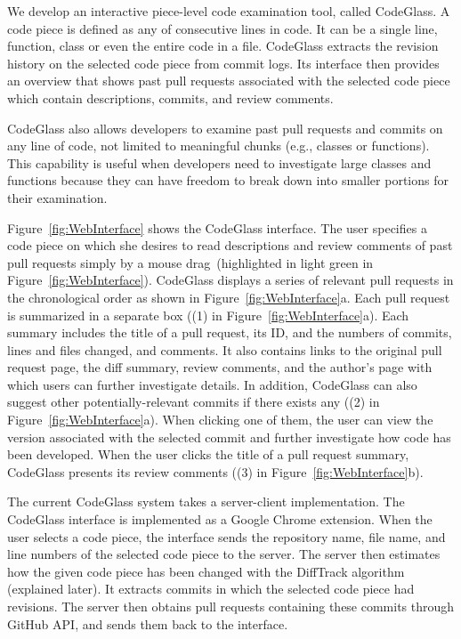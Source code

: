 We develop an interactive piece-level code examination tool, called CodeGlass.
A code piece is defined as any of consecutive lines in code.
It can be a single line, function, class or even the entire code in a file.
CodeGlass extracts the revision history on the selected code piece from commit logs.
Its interface then provides an overview that shows past pull requests associated with the selected code piece which contain descriptions, commits, and review comments.


CodeGlass also allows developers to examine past pull requests and commits on any line of code, not limited to meaningful chunks (e.g., classes or functions).
This capability is useful when developers need to investigate large classes and functions because they can have freedom to break down into smaller portions for their examination.

Figure~\ref{fig:WebInterface} shows the CodeGlass interface.
The user specifies a code piece on which she desires to read descriptions and review comments of past pull requests simply by a mouse drag~(highlighted in light green in Figure~\ref{fig:WebInterface}).
CodeGlass displays a series of relevant pull requests in the chronological order as shown in Figure~\ref{fig:WebInterface}a.
Each pull request is summarized in a separate box ((1) in Figure~\ref{fig:WebInterface}a).
Each summary includes the title of a pull request, its ID, and the numbers of commits, lines and files changed, and comments.
It also contains links to the original pull request page, the diff summary, review comments, and the author's page with which users can further investigate details.
In addition, CodeGlass can also suggest other potentially-relevant commits if there exists any ((2) in Figure~\ref{fig:WebInterface}a).
When clicking one of them, the user can view the version associated with the selected commit and further investigate how code has been developed.
When the user clicks the title of a pull request summary, CodeGlass presents its review comments ((3) in Figure~\ref{fig:WebInterface}b).

      
The current CodeGlass system takes a server-client implementation.
The CodeGlass interface is implemented as a Google Chrome extension.
When the user selects a code piece, the interface sends the repository name, file name, and line numbers of the selected code piece to the server.
The server then estimates how the given code piece has been changed with the DiffTrack algorithm (explained later).
It extracts commits in which the selected code piece had revisions. 
The server then obtains pull requests containing these commits through GitHub API, and sends them back to the interface.


